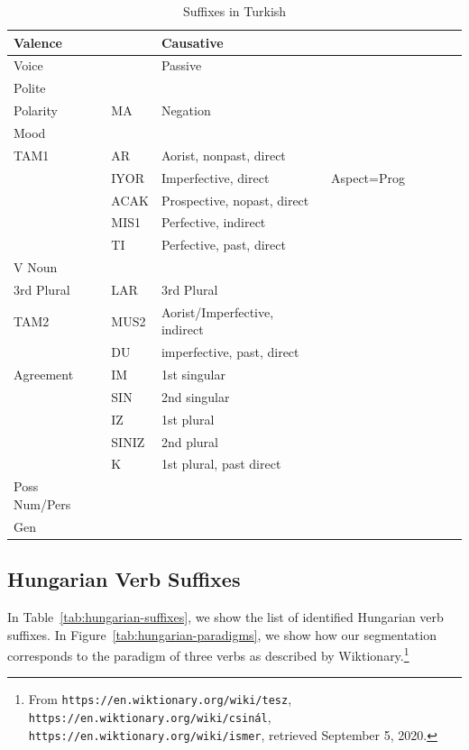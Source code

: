 \documentclass[11pt,letterpaper]{article}
\begin{document}
\begin{table}
\begin{tabular}{llllllll}
\hline
Valence &   & Causative\\
\hline
Voice &   & Passive\\
\hline
Polite &   & \\
\hline
Polarity  & MA & Negation & \\
\hline
Mood \\
\hline
TAM1      & AR & Aorist, nonpast, direct \\
          & IYOR & Imperfective, direct & Aspect=Prog\\
          & ACAK & Prospective, nopast, direct\\
          & MIS1  & Perfective, indirect \\
          & TI & Perfective, past, direct \\
\hline
V Noun &  \\
\hline
3rd Plural& LAR & 3rd Plural\\
\hline
TAM2      & MUS2 & Aorist/Imperfective, indirect \\
          & DU & imperfective, past, direct \\
\hline
Agreement & IM & 1st singular\\
          & SIN &2nd singular\\
          & IZ  & 1st plural\\
          & SINIZ & 2nd plural \\
          & K     & 1st plural, past direct \\
\hline
Poss Num/Pers & \\
\hline
Gen & \\
\hline
\end{tabular}
\caption{Suffixes in Turkish}\label{tab:turkish-suffixes}
\end{table}




\subsection{Hungarian Verb Suffixes}


In Table~\ref{tab:hungarian-suffixes}, we show the list of identified Hungarian verb suffixes.
In Figure~\ref{tab:hungarian-paradigms}, we show how our segmentation corresponds to the paradigm of three verbs as described by Wiktionary.\footnote{From \texttt{https://en.wiktionary.org/wiki/tesz},
\texttt{https://en.wiktionary.org/wiki/csinál},
\texttt{https://en.wiktionary.org/wiki/ismer}, retrieved September 5, 2020.}
\end{document}
